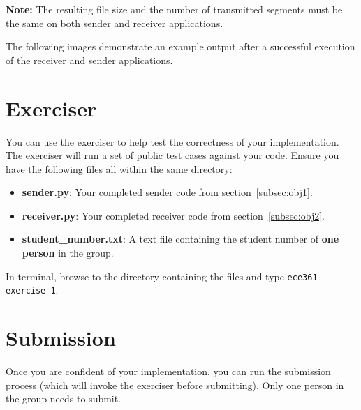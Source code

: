 \documentclass[11pt]{article}
\def\thelab{1}
\begin{document}

\textbf{Note:}
The resulting file size and the number of transmitted segments must be the same on both sender and receiver applications.


The following images demonstrate an example output after a successful execution of the receiver and sender applications.


\section{Exerciser}
\label{sec:exerciser}
You can use the exerciser to help test the correctness of your implementation. The exerciser will run a set of public test cases against your code.
Ensure you have the following files all within the same directory:
\begin{itemize}
    \item \textbf{sender.py}: Your completed sender code from section~\ref{subsec:obj1}.
    \item \textbf{receiver.py}: Your completed receiver code from section~\ref{subsec:obj2}.
    \item \textbf{student\_number.txt}: A text file containing the student number of \textbf{one person} in the group.
\end{itemize}

In terminal, browse to the directory containing the files and type \texttt{ece361-exercise \thelab}.

\section{Submission}
\label{sec:submission}
Once you are confident of your implementation, you can run the submission process (which will invoke the exerciser before submitting). Only one person in the group needs to submit.
\end{document}
